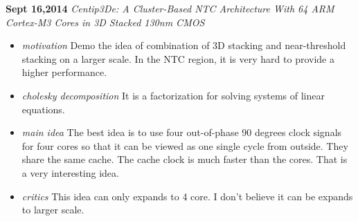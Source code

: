 \documentclass[]{article}
\begin{document}
\noindent \textbf{Sept 16,2014}
\textit{Centip3De: A Cluster-Based NTC Architecture With 64 ARM Cortex-M3 Cores in 3D Stacked 130nm CMOS }
\indent     \begin{itemize}

            \item \textit{motivation} Demo the idea of combination of 3D stacking and near-threshold stacking on a larger
            scale. In the NTC region, it is very hard to provide a higher performance.

            \item \textit{cholesky decomposition} It is a factorization for solving systems of linear equations.

            \item \textit{main idea} The best idea is to use four out-of-phase 90 degrees clock signals for four cores so
            that it can be viewed as one single cycle from outside. They share the same cache.
            The cache clock is much faster than the cores. That is a very interesting idea.

            \item \textit{critics} This idea can only expands to 4 core. I don't believe it can be expands to larger scale.
        \end{itemize}
\end{document}
